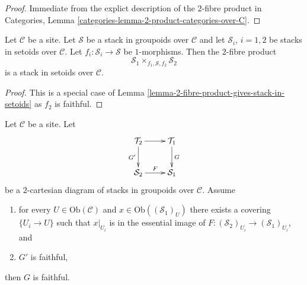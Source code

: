 \begin{proof}
Immediate from the explict description of the $2$-fibre product in
Categories, Lemma \ref{categories-lemma-2-product-categories-over-C}.
\end{proof}

\begin{lemma}
\label{lemma-2-fibre-product-stacks-in-setoids-over-stack-in-groupoids}
Let $\mathcal{C}$ be a site.
Let $\mathcal{S}$ be a stack in groupoids over $\mathcal{C}$ and
let $\mathcal{S}_i$, $i = 1, 2$ be stacks in setoids over $\mathcal{C}$.
Let $f_i : \mathcal{S}_i \to \mathcal{S}$ be $1$-morphisms.
Then the $2$-fibre product
$$
\mathcal{S}_1 \times_{f_1, \mathcal{S}, f_2} \mathcal{S}_2
$$
is a stack in setoids over $\mathcal{C}$.
\end{lemma}

\begin{proof}
This is a special case of
Lemma \ref{lemma-2-fibre-product-gives-stack-in-setoids}
as $f_2$ is faithful.
\end{proof}

\begin{lemma}
\label{lemma-faithful-descent}
Let $\mathcal{C}$ be a site. Let
$$
\xymatrix{
\mathcal{T}_2 \ar[r] \ar[d]_{G'} & \mathcal{T}_1 \ar[d]^G \\
\mathcal{S}_2 \ar[r]^F & \mathcal{S}_1
}
$$
be a $2$-cartesian diagram of stacks in groupoids over $\mathcal{C}$.
Assume
\begin{enumerate}
\item for every $U \in \text{Ob}(\mathcal{C})$ and
$x \in \text{Ob}((\mathcal{S}_1)_U)$ there exists a covering
$\{U_i \to U\}$ such that $x|_{U_i}$ is in the essential
image of $F : (\mathcal{S}_2)_{U_i} \to (\mathcal{S}_1)_{U_i}$, and
\item $G'$ is faithful,
\end{enumerate}
then $G$ is faithful.
\end{lemma}

